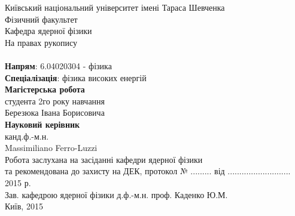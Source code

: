 \begin{titlepage}
{\center
  Київський національний університет імені Тараса Шевченка\\
  Фізичний факультет\\
  Кафедра ядерної фізики\\[1cm]}
{\flushright \small
  На правах рукопису\\[4cm]}
{\center \large \bf \thesistopicUA \\[2cm]}
{\flushleft
  {\bf Напрям}: 6.04020304 - фізика\\
   {\bf Спеціалізація}: фізика високих енергій\\[1cm]
  \leftskip=7.4cm
  {\bf Магістерська робота\\}
  студента 2го року навчання\\
  Березюка Івана Борисовича\\[1cm]
  {\bf Науковий керівник\\}
  канд.ф.-м.н.\\
  Massimiliano  Ferro-Luzzi \\[2.2cm]}
{\small \noindent
  Робота заслухана на засіданні кафедри ядерної фізики\\
  та рекомендована до захисту на ДЕК, протокол № ......... від ........................... 2015 р.\\[0.4cm]
  Зав. кафедрою ядерної фізики \hspace{1.8cm} д.ф.-м.н. проф. Каденко Ю.М.\\[0.7cm]}
{\center Київ, 2015\\}
\end{titlepage}
